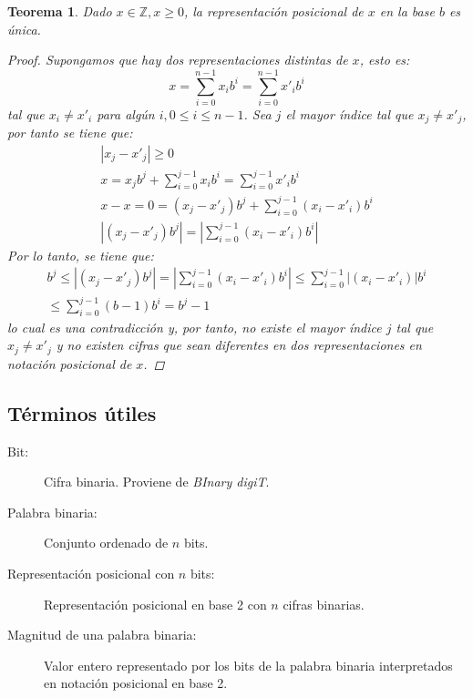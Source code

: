 \documentclass[spanish,a4paper,12pt,titlepage]{article}
\newtheorem{theorem}{Teorema}%
\theoremstyle{definition}
\theoremstyle{remark}
\newcommand{\bbZ}{\mathbb{Z}}
\begin{document}
\begin{theorem}\label{theorem-pos-uniq}
  Dado $x \in \bbZ, x \ge 0$, la representación posicional de $x$ en
  la base $b$ es única.
  \begin{proof}
    Supongamos que hay dos representaciones distintas de $x$, esto es:
    \[
      x = \sum_{i=0}^{n-1} x_i b^i = \sum_{i=0}^{n-1} x'_i b^i
    \]
    tal que $x_i \neq x'_i$ para algún $i, 0 \le i \le n-1$. Sea $j$ el
    mayor índice tal que $x_j \neq x'_j$, por tanto se tiene que:
    \begin{align*}
      |x_j-x'_j| \ge 0 \\
      x = x_j b^j + \sum_{i=0}^{j-1} x_i b^i
        = \sum_{i=0}^{j-1} x'_i b^i \\
      x-x = 0 = (x_j-x'_j) b^j + \sum_{i=0}^{j-1} (x_i-x'_i)b^i \\
      \left| (x_j-x'_j) b^j \right| =
        \left| \sum_{i=0}^{j-1} (x_i-x'_i)b^i \right|
    \end{align*}
    Por lo tanto, se tiene que:
    \begin{align*}
      b^j \le \left| (x_j-x'_j) b^j \right|
        = \left| \sum_{i=0}^{j-1} (x_i-x'_i)b^i \right| \le
        \sum_{i=0}^{j-1} |(x_i-x'_i)|b^i \\
        \le \sum_{i=0}^{j-1} (b-1)b^i = b^j - 1
    \end{align*}
    lo cual es una contradicción y, por tanto, no existe el mayor índice
    $j$ tal que $x_j \neq x'_j$ y no existen cifras que sean diferentes en
    dos representaciones en notación posicional de $x$.
  \end{proof}
\end{theorem}

\subsection{Términos útiles}

\begin{description}
  \item [Bit:] Cifra binaria. Proviene de \emph{BInary digiT}.
  \item [Palabra binaria:] Conjunto ordenado de $n$ bits.
  \item [Representación posicional con $n$ bits:] Representación posicional en base 2 con $n$ cifras binarias.
  \item [Magnitud de una palabra binaria:] Valor entero representado por los bits de la palabra binaria interpretados en notación posicional en base 2.
\end{description}
\end{document}
